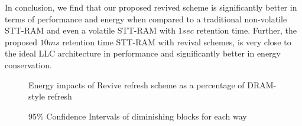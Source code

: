 
In conclusion, we find that our proposed revived scheme is significantly better in terms of performance and energy
when compared to a traditional non-volatile STT-RAM and even a volatile STT-RAM with $1sec$ retention time.
Further, the proposed $10ms$ retention time STT-RAM with revival schemes, is very close to the ideal LLC architecture in performance and significantly better in energy conservation.



\begin{figure*} %
\begin{minipage}{0.45\textwidth}
\centering
 \caption{\label{fig:revive-dram} Energy impacts of Revive refresh scheme as a percentage of DRAM-style refresh}
\end{minipage}
\hfill %
\begin{minipage}{0.48\textwidth}
 \centering
 \caption{\label{fig:confi} 95\% Confidence Intervals of diminishing blocks for each way}
\end{minipage}
\end{figure*}



